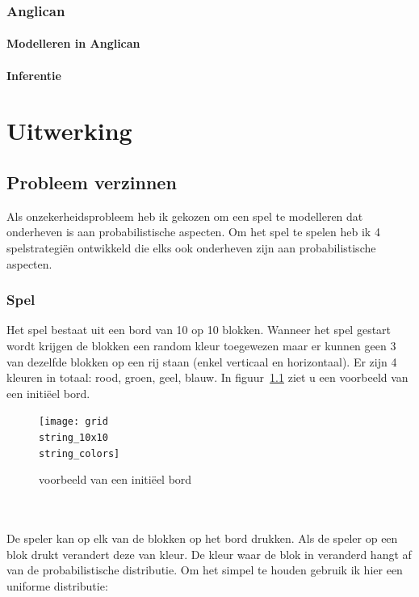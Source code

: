 \documentclass[12pt,a4paper,oneside]{book}
\theoremstyle{definition}
\begin{document}
\subsection{Anglican}
\label{sec:Anglican}
\subsubsection{Modelleren in Anglican} 
\subsubsection{Inferentie}
\label{subsubsec:inferentieAnglican}


\chapter{Uitwerking}
\section{Probleem verzinnen}
Als onzekerheidsprobleem heb ik gekozen om een spel te modelleren dat onderheven is aan probabilistische aspecten. Om het spel te spelen heb ik 4 spelstrategiën ontwikkeld die elks ook onderheven zijn aan probabilistische aspecten.
\subsection{Spel}
Het spel bestaat uit een bord van 10 op 10 blokken. Wanneer het spel gestart wordt krijgen de blokken een random kleur toegewezen maar er kunnen geen 3 van dezelfde blokken op een rij staan (enkel verticaal en horizontaal). Er zijn 4 kleuren in totaal: rood, groen, geel, blauw. In figuur~\ref{figure:initialboard} ziet u een voorbeeld van een initi\"{e}el bord.
\begin{figure}
	\centering
	\texttt{[image: grid\\string\_10x10\\string\_colors]}
	\caption{voorbeeld van een initi\"{e}el bord}
	\label{figure:initialboard}
\end{figure}
\\\\
De speler kan op elk van de blokken op het bord drukken. Als de speler op een blok drukt verandert deze van kleur. De kleur waar de blok in veranderd hangt af van de probabilistische distributie. Om het simpel te houden gebruik ik hier een uniforme distributie:
\end{document}
